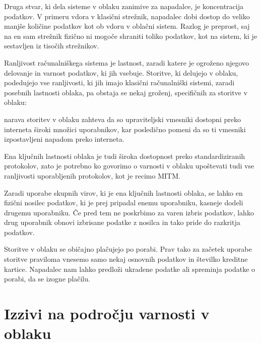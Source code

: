 \documentclass[12pt,a4paper,openany,tikz]{book}
\theoremstyle{plain}
\theoremstyle{definition}
\begin{document}
Druga stvar, ki dela sisteme v oblaku zanimive za napadalce, je koncentracija podatkov. V primeru vdora v klasični strežnik, napadalec dobi dostop do veliko manjše količine podatkov kot ob vdoru v oblačni sistem. Razlog je preprost, saj na en sam strežnik fizično ni mogoče shraniti toliko podatkov, kot na sistem, ki je sestavljen iz tisočih strežnikov.

Ranljivost računalniškega sistema je lastnost, zaradi katere je ogroženo njegovo delovanje in varnost podatkov, ki jih vsebuje. Storitve, ki delujejo v oblaku,  podedujejo vse ranljivosti, ki jih imajo klasični računalniški sistemi, zaradi posebnih lastnosti oblaka, pa obstaja se nekaj groženj, specifičnih za storitve v oblaku:

\begin{description}[style=nextline]

\item[Nedovoljen dostop do upraviteljskega in programskega vmesnika] narava storitev v oblaku zahteva da so upraviteljski vmesniki dostopni preko interneta široki množici uporabnikov, kar posledično pomeni da so ti vmesniki izpostavljeni napadom preko interneta.

\item[Ranljivosti Internetnega protokola] Ena ključnih lastnosti oblaka je tudi široka dostopnost preko standardiziranih protokolov, zato je potrebno ko govorimo o varnosti v oblaku upoštevati tudi vse ranljivosti uporabljenih protokolov, kot je recimo \gls{MITM}.

\item[Ranljivosti obnovitve podatkov] Zaradi uporabe skupnih virov, ki je ena ključnih lastnosti oblaka, se lahko en fizični nosilec podatkov, ki je prej pripadal enemu uporabniku, kasneje dodeli drugemu uporabniku. Če pred tem ne poskrbimo za varen izbris podatkov, lahko drug uporabnik obnovi izbrisane podatke z nosilca in tako pride do razkritja podatkov.

\item[Izogibanje merjenju in plačilu] Storitve v oblaku se običajno plačujejo po porabi. Prav tako za začetek uporabe storitve praviloma vnesemo samo nekaj osnovnih podatkov in številko kreditne kartice. Napadalec nam lahko predloži ukradene podatke ali spreminja podatke o porabi, da se izogne plačilu.

\end{description}

\section{Izzivi na področju varnosti v oblaku}
\label{sec:Izzivi na področju varnosti v oblaku}
\end{document}
